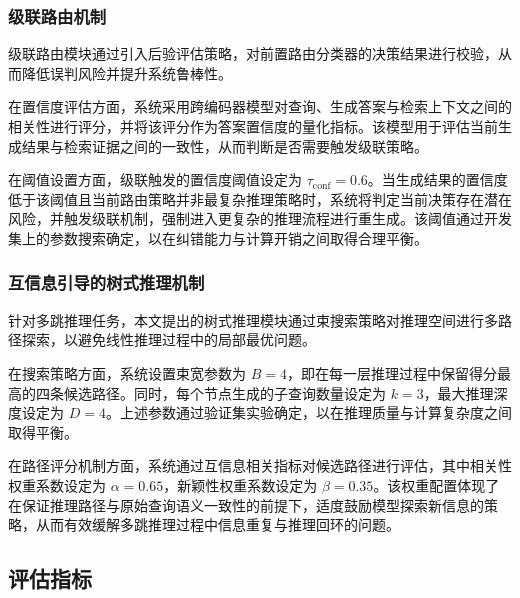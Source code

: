 \subsubsection*{级联路由机制}

级联路由模块通过引入后验评估策略，对前置路由分类器的决策结果进行校验，从而降低误判风险并提升系统鲁棒性。

在置信度评估方面，系统采用跨编码器模型对查询、生成答案与检索上下文之间的相关性进行评分，并将该评分作为答案置信度的量化指标。该模型用于评估当前生成结果与检索证据之间的一致性，从而判断是否需要触发级联策略。

在阈值设置方面，级联触发的置信度阈值设定为 $\tau_{\text{conf}} = 0.6$。当生成结果的置信度低于该阈值且当前路由策略并非最复杂推理策略时，系统将判定当前决策存在潜在风险，并触发级联机制，强制进入更复杂的推理流程进行重生成。该阈值通过开发集上的参数搜索确定，以在纠错能力与计算开销之间取得合理平衡。


\subsubsection*{互信息引导的树式推理机制}

针对多跳推理任务，本文提出的树式推理模块通过束搜索策略对推理空间进行多路径探索，以避免线性推理过程中的局部最优问题。

在搜索策略方面，系统设置束宽参数为 $B = 4$，即在每一层推理过程中保留得分最高的四条候选路径。同时，每个节点生成的子查询数量设定为 $k = 3$，最大推理深度设定为 $D = 4$。上述参数通过验证集实验确定，以在推理质量与计算复杂度之间取得平衡。

在路径评分机制方面，系统通过互信息相关指标对候选路径进行评估，其中相关性权重系数设定为 $\alpha = 0.65$，新颖性权重系数设定为 $\beta = 0.35$。该权重配置体现了在保证推理路径与原始查询语义一致性的前提下，适度鼓励模型探索新信息的策略，从而有效缓解多跳推理过程中信息重复与推理回环的问题。


\subsection{评估指标}

